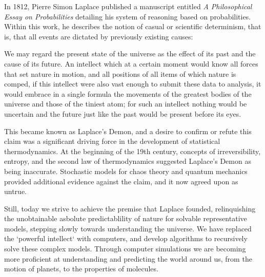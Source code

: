 In 1812, Pierre Simon Laplace published a manuscript entitled
\textit{A Philosophical Essay on Probabilities} detailing his system
of reasoning based on probabilities.\cite{LaplaceXX} Within this work,
he describes the notion of casual or scientific determinism, that is,
that all events are dictated by previously existing causes:
 
\begin{displayquote}
We may regard the present state of the universe as the effect of
its past and the cause of its future. An intellect which at a certain
moment would know all forces that set nature in motion, and all
positions of all items of which nature is comped, if this intellect
were also vast enough to submit these data to analysis, it would
embrace in a single formula the movements of the greatest bodies of
the universe and those of the tiniest atom; for such an intellect
nothing would be uncertain and the future just like the past would be
present before its eyes.
\end{displayquote}

This became known as Laplace's Demon, and a desire to confirm or
refute this claim was a significant driving force in the development
of statistical thermodynamics.  At the beginning of the 19th century,
concepts of irreversibility, entropy, and the second law of
thermodynamics suggested Laplace's Demon as being inaccurate.
Stochastic models for chaos theory and quantum mechanics provided
additional evidence against the claim, and it now agreed upon as
untrue.

Still, today we strive to achieve the premise that Laplace founded,
relinquishing the unobtainable asbolute predictablility of nature for
solvable representative models, stepping slowly towards understanding
the universe. We have replaced the `powerful intellect` with
computers, and develop algorithms to recursively solve these
complex models. Through computer simulations we are becoming more
proficient at understanding and predicting the world around us, from
the motion of planets, to the properties of molecules.

